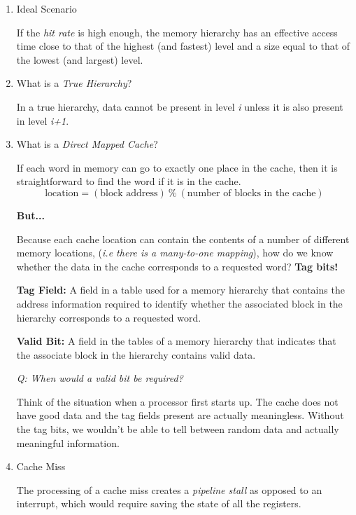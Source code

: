\documentclass[12pt]{article}
\newenvironment{QandA}{\begin{enumerate}[label=\bfseries\arabic*.]\bfseries}
                      {\end{enumerate}}
\newenvironment{answered}{\par\quad\normalfont}{}
\begin{document}
\begin{QandA}
\item Ideal Scenario
\begin{answered}
If the \textit{hit rate} is high enough, the memory hierarchy has an effective access time close to that of the highest (and fastest) level and a size equal to that of the lowest (and largest) level.
\end{answered}

\item What is a \textit{True Hierarchy}?
\begin{answered}
In a true hierarchy, data cannot be present in level \textit{i} unless it is also present in level \textit{i+1}.
\end{answered}

\item What is a \textit{Direct Mapped Cache}?
\begin{answered}
If each word in memory can go to exactly one place in the cache, then it is straightforward to find the word if it is in the cache.
\begin{equation*}
    \text{location} = (\text{block address})\ \%\ (\text{number of blocks in the cache})
\end{equation*}

\textbf{But...}

Because each cache location can contain the contents of a number of different memory locations, (\textit{i.e there is a many-to-one mapping}), how do we know whether the data in the cache corresponds to a requested word? \textbf{Tag bits!}

\textbf{Tag Field:} A field in a table used for a memory hierarchy that contains the address information required to identify whether the associated block in the hierarchy corresponds to a requested word. 

\textbf{Valid Bit:} A field in the tables of a memory hierarchy that indicates that the associate block in the hierarchy contains valid data.

\textit{Q: When would a valid bit be required?}

\quad Think of the situation when a processor first starts up. The cache does not have good data and the tag fields present are actually meaningless. Without the tag bits, we wouldn't be able to tell between random data and actually meaningful information. 
\end{answered}

\item Cache Miss
\begin{answered}
The processing of a cache miss creates a \textit{pipeline stall} as opposed to an interrupt, which would require saving the state of all the registers. 
\end{answered}


\end{QandA}
\end{document}
